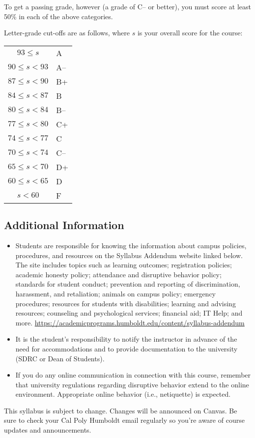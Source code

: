 \documentclass[12pt]{article}
\begin{document}
To get a passing grade, however (a grade of C– or better), you must score at
least 50\% in each of the above categories.

Letter-grade cut-offs are as follows, where $s$ is your overall score for the
course:

\vspace{1em}
\begin{adjustwidth}{3em}{}
\begin{NiceTabular}{cl}
$93 \le s$ & A \\
$90 \le s < 93$ & A– \\
$87 \le s < 90$ & B+ \\
$84 \le s < 87$ & B \\
$80 \le s < 84$ & B– \\
$77 \le s < 80$ & C+ \\
$74 \le s < 77$ & C \\
$70 \le s < 74$ & C– \\
$65 \le s < 70$ & D+ \\
$60 \le s < 65$ & D \\
$s < 60$ & F
\end{NiceTabular}
\end{adjustwidth}

\subsection*{Additional Information}

\begin{itemize}
\item Students are responsible for knowing the information about campus
policies, procedures, and resources on the Syllabus Addendum website linked
below. The site includes topics such as learning outcomes; registration
policies; academic honesty policy; attendance and disruptive behavior policy;
standards for student conduct; prevention and reporting of discrimination,
harassment, and retaliation; animals on campus policy; emergency procedures;
resources for students with disabilities; learning and advising resources;
counseling and psychological services; financial aid; IT Help; and more.
\url{https://academicprograms.humboldt.edu/content/syllabus-addendum}

\item It is the student's responsibility to notify the instructor in advance
of the need for accommodations and to provide documentation to the university
(SDRC or Dean of Students).

\item If you do any online communication in connection with this course,
remember that university regulations regarding disruptive behavior extend to
the online environment. Appropriate online behavior (i.e., netiquette) is
expected.
\end{itemize}

This syllabus is subject to change. Changes will be announced on Canvas. Be
sure to check your Cal Poly Humboldt email regularly so you're aware of course
updates and announcements.
\end{document}
